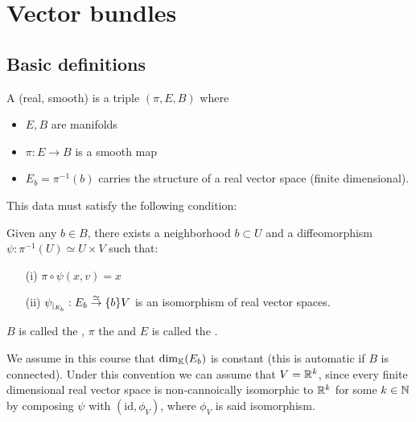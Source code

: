 \section{Vector bundles}

\subsection{Basic definitions}

\begin{definition*}
    A (real, smooth)  is a triple \((\pi,E,B)\) where 
    \begin{itemize}
        \item \(E,B\) are manifolds 
        \item \(\pi:E\to B\) is a smooth map
        \item \(E_b=\pi^{-1}(b)\) carries the structure of a real vector space (finite dimensional).
    \end{itemize}
 
    This data must satisfy the following  condition:

    Given any \(b\in B\), there exists a neighborhood \(b\subset U\) and a diffeomorphism \(\psi:\pi^{-1}(U)\simeq U\times V\)
    such that: 
    \begin{enumerate}
        \item[(i)] \(\pi\circ \psi(x,v)=x\)
        \item[(ii)] \(\psi_{|_{E_b}}:E_b\stackrel{\simeq}{\to} \{b\} V\) is an isomorphism of real vector spaces.  
    \end{enumerate}
    
    \(B\) is called the , \(\pi\) the  and \(E\) is called the .

\end{definition*}

\begin{remark}
    We assume in this course that \(\text{dim}_{\mathbb{K}}(E_b)\) is constant (this is automatic if \(B\) is connected).
    Under this convention we can assume that \(V=\mathbb{R}^k\), since every finite dimensional real vector space is non-cannoically isomorphic to \(\mathbb{R}^k\) for some \(k\in \mathbb{N}\) by composing \(\psi\) with \((\text{id},\phi_V)\), where \(\phi_V\) is said isomorphism.
\end{remark}

